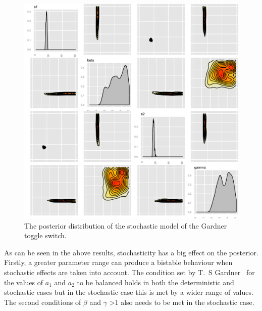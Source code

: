 \begin{figure}[p]
\centering
\includegraphics[scale=0.7]{images/Gardner/posterior_stch_high_mean.pdf}
\caption{The posterior distribution of the stochastic model of the Gardner toggle switch.}
\label{fig:Gard_post_stch}
\end{figure}

As can be seen in the above results, stochasticity has a big effect on the posterior. Firstly, a greater parameter range can produce a bistable behaviour when stochastic effects are taken into account. The condition set by T.~S Gardner~\autocite{Gardner:2000vha} for the values of $a_1$ and $a_2$ to be balanced holds in both the deterministic and stochastic cases but in the stochastic case this is met by a wider range of values. The second conditions of $\beta$  and $\gamma$ \textgreater 1 also needs to be met in the stochastic case. 

